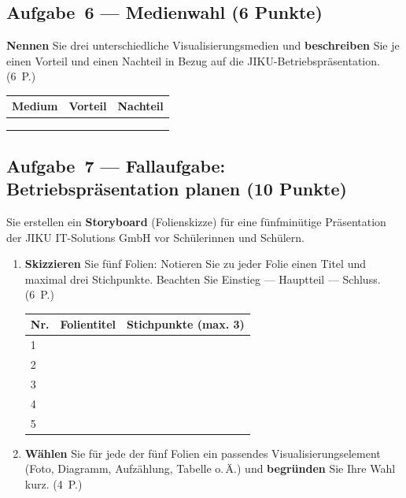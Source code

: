 \documentclass[11pt, a4paper]{article}
\begin{document}
\subsection*{Aufgabe~6 --- Medienwahl (6 Punkte)}

\textbf{Nennen} Sie drei unterschiedliche Visualisierungsmedien und \textbf{beschreiben} Sie
je einen Vorteil und einen Nachteil in Bezug auf die JIKU-Betriebspräsentation. \hfill (6~P.)

\bigskip

\noindent
\begin{tabular}{|p{3cm}|p{5.5cm}|p{4cm}|}
\hline
\textbf{Medium} & \textbf{Vorteil} & \textbf{Nachteil}\\
\hline
 & & \\[1.2cm]
\hline
 & & \\[1.2cm]
\hline
 & & \\[1.2cm]
\hline
\end{tabular}

\subsection*{Aufgabe~7 --- Fallaufgabe: Betriebspräsentation planen (10 Punkte)}

Sie erstellen ein \textbf{Storyboard} (Folienskizze) für eine fünfminütige Präsentation der
JIKU IT-Solutions GmbH vor Schülerinnen und Schülern.

\begin{enumerate}[label=(\alph*)]
  \item \textbf{Skizzieren} Sie fünf Folien: Notieren Sie zu jeder Folie einen Titel und
  maximal drei Stichpunkte. Beachten Sie Einstieg --- Hauptteil --- Schluss. \hfill (6~P.)

  \bigskip

  \noindent
  \begin{tabular}{|p{0.5cm}|p{3.5cm}|p{8.5cm}|}
  \hline
  \textbf{Nr.} & \textbf{Folientitel} & \textbf{Stichpunkte (max. 3)}\\
  \hline
  1 & & \\[1.5cm]
  \hline
  2 & & \\[1.5cm]
  \hline
  3 & & \\[1.5cm]
  \hline
  4 & & \\[1.5cm]
  \hline
  5 & & \\[1.5cm]
  \hline
  \end{tabular}

  \bigskip

  \item \textbf{Wählen} Sie für jede der fünf Folien ein passendes Visualisierungselement
  (Foto, Diagramm, Aufzählung, Tabelle o.\,Ä.) und \textbf{begründen} Sie Ihre Wahl kurz. \hfill (4~P.)

  \vspace{7cm}
\end{enumerate}
\end{document}
